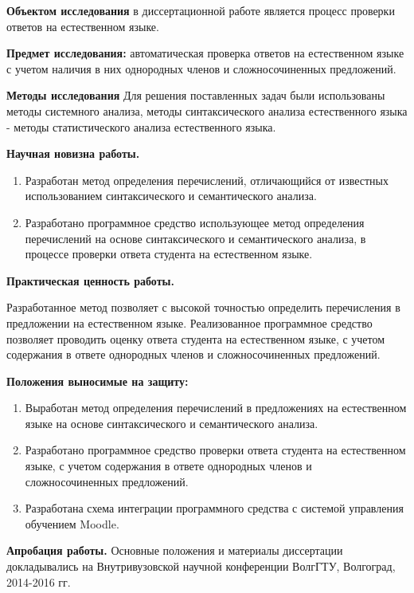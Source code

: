 \documentclass[a4paper]{G2-105}
\begin{document}
\par \textbf{Объектом исследования} в диссертационной работе является процесс проверки ответов на естественном языке.
\par \textbf{Предмет исследования:} автоматическая проверка ответов на естественном языке с учетом наличия в них однородных членов и сложносочиненных предложений.
\par \textbf{Методы исследования} Для решения поставленных задач были использованы методы системного анализа, методы синтаксического анализа естественного языка - методы статистического анализа естественного языка.

\par \textbf{Научная новизна работы.} %
\begin{enumerate}
    \item Разработан метод определения перечислений, отличающийся от известных использованием синтаксического и семантического анализа.
    \item Разработано программное средство использующее метод определения перечислений на основе синтаксического и семантического анализа, в процессе проверки ответа студента на естественном языке.
\end{enumerate}

\par \textbf{Практическая ценность работы.} %
\par Разработанное метод позволяет с высокой точностью определить перечисления в предложении на естественном языке. Реализованное программное средство позволяет проводить оценку ответа студента на естественном языке, с учетом содержания в ответе однородных членов и сложносочиненных предложений.

\par \textbf{Положения выносимые на защиту:} %
\begin{enumerate}
    \item Выработан метод определения перечислений в предложениях на естественном языке на основе синтаксического и семантического анализа.
    \item Разработано программное средство проверки ответа студента на естественном языке, с учетом содержания в ответе однородных членов и сложносочиненных предложений.
    \item Разработана схема интеграции программного средства с системой управления обучением Moodle.
\end{enumerate}
\par \textbf{Апробация работы.} Основные положения и материалы диссертации докладывались на Внутривузовской научной конференции ВолгГТУ, Волгоград, 2014-2016 гг.
\end{document}
